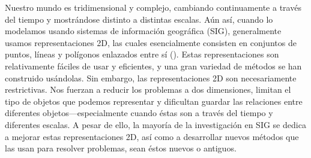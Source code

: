 {

Nuestro mundo es tridimensional y complejo, cambiando continuamente a través del tiempo y mostrándose distinto a distintas escalas.
Aún así, cuando lo modelamos usando sistemas de información geográfica (SIG), generalmente usamos representaciones 2D, las cuales esencialmente consisten en conjuntos de puntos, líneas y polígonos enlazados entre sí ().
Estas representaciones son relativamente fáciles de usar y eficientes, y una gran variedad de métodos se han construido usándolas.
Sin embargo, las representaciones 2D son necesariamente restrictivas.
Nos fuerzan a reducir los problemas a dos dimensiones, limitan el tipo de objetos que podemos representar y dificultan guardar las relaciones entre diferentes objetos---especialmente cuando éstas son a través del tiempo y diferentes escalas.
A pesar de ello, la mayoría de la investigación en SIG se dedica a mejorar estas representaciones 2D, así como a desarrollar nuevos métodos que las usan para resolver problemas, sean éstos nuevos o antiguos.

}
